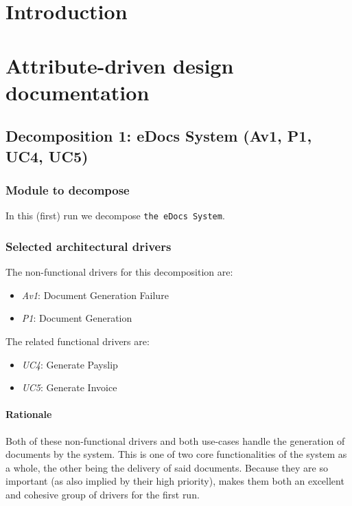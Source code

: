 \documentclass[a4paper,10pt]{article}
\begin{document}


\tableofcontents
\newpage

\section{Introduction}\label{sec:introduction}

\section{Attribute-driven design documentation}\label{sec:add}
\subsection{Decomposition 1: eDocs System (Av1, P1, UC4, UC5)}
\subsubsection{Module to decompose}
In this (first) run we decompose \texttt{the eDocs System}.

\subsubsection{Selected architectural drivers}
The non-functional drivers for this decomposition are:

\begin{itemize}
    \item \emph{Av1}: Document Generation Failure
    \item \emph{P1}: Document Generation
\end{itemize}

The related functional drivers are:

\begin{itemize}
    \item \emph{UC4}: Generate Payslip
    \item \emph{UC5}: Generate Invoice
\end{itemize}

\paragraph{Rationale}
Both of these non-functional drivers and both use-cases handle the generation of documents by the system. This is one of two core functionalities of the system as a whole, the other being the delivery of said documents. Because they are so important (as also implied by their high priority), makes them both an excellent and cohesive group of drivers for the first run.
\end{document}
